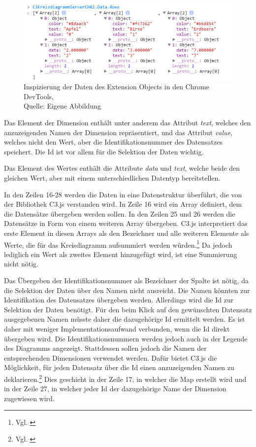 \ifIncludeFigures\begin{figure}[htbp]
	\centering
		\includegraphics[width=1.00\textwidth]{./img/DevTools/DataRowsAll.png}
	\caption[Inspizierung der Daten des Extension Objects in den Chrome DevTools]{Inspizierung der Daten des Extension Objects in den Chrome DevTools,\\Quelle: Eigene Abbildung}
	\label{fig:InspectDataRowsAll}
\end{figure}\fi

Das Element der Dimension enthält unter anderem das Attribut \textit{text}, welches den anzu\-zeigenden Namen der Dimension repräsentiert, und das Attribut \textit{value}, welches nicht den Wert, aber die Identifikationsnummer des Daten\-satzes speichert. Die Id ist vor allem für die Selektion der Daten wichtig.

Das Element des Wertes enthält die Attribute \textit{data} und \textit{text}, welche beide den gleichen Wert, aber mit einem unterschiedlichen Daten\-typ bereitstellen.


In den Zeilen 16-28 werden die Daten in eine Daten\-struktur überführt, die von der Bibliothek C3.js verstanden wird. In Zeile 16 wird ein Array definiert, dem die Daten\-sätze übergeben werden sollen. In den Zeilen 25 und 26 werden die Daten\-sätze in Form von einem weiteren Array übergeben. C3.js interpretiert das erste Element in diesen Arrays als den Bezeichner und alle weiteren Elemente als Werte, die für das Kreisdiagramm aufsummiert werden würden.\footnote{Vgl. \cite{C3ColumnOrientedData}} Da jedoch lediglich ein Wert als zweites Element hinzugefügt wird, ist eine Summierung nicht nötig.



Das Übergeben der Identifikationsnummer als Bezeichner der Spalte ist nötig, da die Selektion der Daten über den Namen nicht ausreicht. Die Namen könnten zur Identifikation des Daten\-satzes übergeben werden. Allerdings wird die Id zur Selektion der Daten benötigt. Für den beim Klick auf den gewünschten Daten\-satz ausgegebenen Namen müsste daher die dazugehörige Id ermittelt werden. Es ist daher mit weniger Implementationsaufwand verbunden, wenn die Id direkt übergeben wird. Die Identifikationsnummern werden jedoch auch in der Legende des Diagramms angezeigt. Stattdessen sollen jedoch die Namen der entsprechenden Dimensionen verwendet werden. Dafür bietet C3.js die Möglich\-keit, für jeden Daten\-satz über die Id einen anzuzeigenden Namen zu deklarieren.\footnote{Vgl. \cite{C3DataName}} Dies geschieht in der Zeile 17, in welcher die Map erstellt wird und in der Zeile 27, in welcher jeder Id der dazugehörige Name der Dimension zugewiesen wird.

